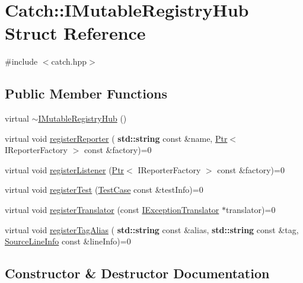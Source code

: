 \hypertarget{struct_catch_1_1_i_mutable_registry_hub}{}\section{Catch\+:\+:I\+Mutable\+Registry\+Hub Struct Reference}
\label{struct_catch_1_1_i_mutable_registry_hub}


{\ttfamily \#include $<$catch.\+hpp$>$}

\subsection*{Public Member Functions}
\begin{DoxyCompactItemize}
\item 
virtual \hyperlink{struct_catch_1_1_i_mutable_registry_hub_a759ca1e044e19f905fb4d306f1367193}{$\sim$\+I\+Mutable\+Registry\+Hub} ()
\item 
virtual void \hyperlink{struct_catch_1_1_i_mutable_registry_hub_aab72d0aa1fa14627f1a6a4c893ae0a12}{register\+Reporter} (\textbf{ std\+::string} const \&name, \hyperlink{class_catch_1_1_ptr}{Ptr}$<$ I\+Reporter\+Factory $>$ const \&factory)=0
\item 
virtual void \hyperlink{struct_catch_1_1_i_mutable_registry_hub_ae06fcb90ba3f2b389d450cd81e229276}{register\+Listener} (\hyperlink{class_catch_1_1_ptr}{Ptr}$<$ I\+Reporter\+Factory $>$ const \&factory)=0
\item 
virtual void \hyperlink{struct_catch_1_1_i_mutable_registry_hub_a11b85c6744d88c9f83fe16ad4a8dd451}{register\+Test} (\hyperlink{class_catch_1_1_test_case}{Test\+Case} const \&test\+Info)=0
\item 
virtual void \hyperlink{struct_catch_1_1_i_mutable_registry_hub_ae6825365102693cf7707db022a2c2b49}{register\+Translator} (const \hyperlink{struct_catch_1_1_i_exception_translator}{I\+Exception\+Translator} $\ast$translator)=0
\item 
virtual void \hyperlink{struct_catch_1_1_i_mutable_registry_hub_abf2e386b6f94f615719ada711adbf822}{register\+Tag\+Alias} (\textbf{ std\+::string} const \&alias, \textbf{ std\+::string} const \&tag, \hyperlink{struct_catch_1_1_source_line_info}{Source\+Line\+Info} const \&line\+Info)=0
\end{DoxyCompactItemize}


\subsection{Constructor \& Destructor Documentation}
\mbox{\label{struct_catch_1_1_i_mutable_registry_hub_a759ca1e044e19f905fb4d306f1367193}} 
